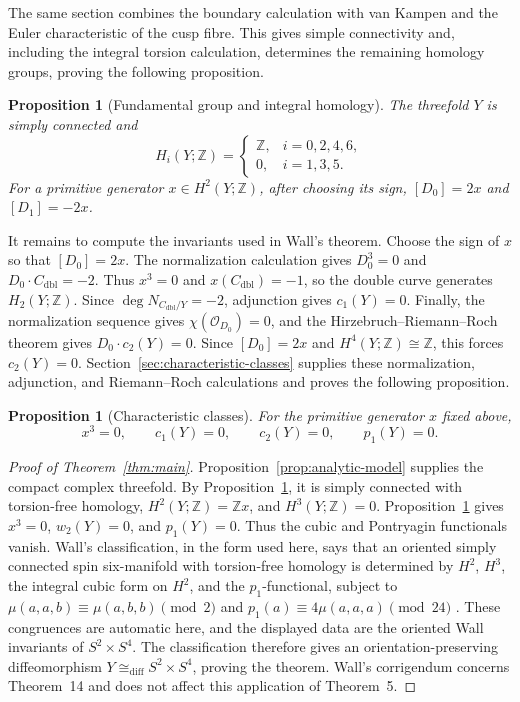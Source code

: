 \documentclass[11pt]{article}
\newtheorem{proposition}[theorem]{Proposition}
\theoremstyle{definition}
\theoremstyle{remark}
\numberwithin{equation}{section}
\newcommand{\ZZ}{\mathbb Z}
\begin{document}
The same section combines the boundary calculation with van Kampen and the
Euler characteristic of the cusp fibre.  This gives simple connectivity and,
including the integral torsion calculation, determines the remaining
homology groups, proving the following proposition.

\begin{proposition}[Fundamental group and integral homology]\label{prop:integral-topology}
The threefold $Y$ is simply connected and
\[
 H_i(Y;\ZZ)=
 \begin{cases}
  \ZZ,&i=0,2,4,6,\\
  0,&i=1,3,5.
 \end{cases}
\]
For a primitive generator $x\in H^2(Y;\ZZ)$, after choosing its sign,
$[D_0]=2x$ and $[D_1]=-2x$.
\end{proposition}

It remains to compute the invariants used in Wall's theorem.  Choose the sign
of $x$ so that $[D_0]=2x$.  The normalization calculation gives
$D_0^3=0$ and $D_0\cdot C_{\mathrm{dbl}}=-2$.  Thus $x^3=0$ and
$x(C_{\mathrm{dbl}})=-1$, so the double curve generates
$H_2(Y;\mathbb Z)$.  Since
$\deg N_{C_{\mathrm{dbl}}/Y}=-2$, adjunction gives $c_1(Y)=0$.
Finally, the normalization sequence gives $\chi(\mathcal O_{D_0})=0$, and
the Hirzebruch--Riemann--Roch theorem gives $D_0\cdot c_2(Y)=0$.  Since
$[D_0]=2x$ and $H^4(Y;\mathbb Z)\cong\mathbb Z$, this forces
$c_2(Y)=0$.  Section~\ref{sec:characteristic-classes} supplies these
normalization, adjunction, and Riemann--Roch calculations and proves the
following proposition.

\begin{proposition}[Characteristic classes]
\label{prop:characteristic-classes}
For the primitive generator $x$ fixed above,
\[
 x^3=0,\qquad c_1(Y)=0,\qquad c_2(Y)=0,
 \qquad p_1(Y)=0.
\]
\end{proposition}

\begin{proof}[Proof of Theorem~\ref{thm:main}]
Proposition~\ref{prop:analytic-model} supplies the compact complex
threefold.  By Proposition~\ref{prop:integral-topology}, it is simply
connected with torsion-free homology, $H^2(Y;\ZZ)=\ZZ x$, and
$H^3(Y;\ZZ)=0$.  Proposition~\ref{prop:characteristic-classes} gives
$x^3=0$, $w_2(Y)=0$, and $p_1(Y)=0$.  Thus the cubic and Pontryagin
functionals vanish.  Wall's classification, in the form used here, says that
an oriented simply connected spin six-manifold with torsion-free homology is
determined by $H^2$, $H^3$, the integral cubic form on $H^2$, and the
$p_1$-functional, subject to
$\mu(a,a,b)\equiv\mu(a,b,b)\pmod2$ and
$p_1(a)\equiv4\mu(a,a,a)\pmod{24}$
\citep[Theorem~5]{Wall1966}.  These congruences are automatic here, and the
displayed data are the oriented Wall invariants of $S^2\times S^4$.
The classification therefore gives an
orientation-preserving diffeomorphism
$Y\cong_{\mathrm{diff}}S^2\times S^4$, proving the theorem.
Wall's corrigendum \citep{Wall1967} concerns Theorem~14 and does not affect
this application of Theorem~5.\qedhere
\end{proof}
\end{document}
